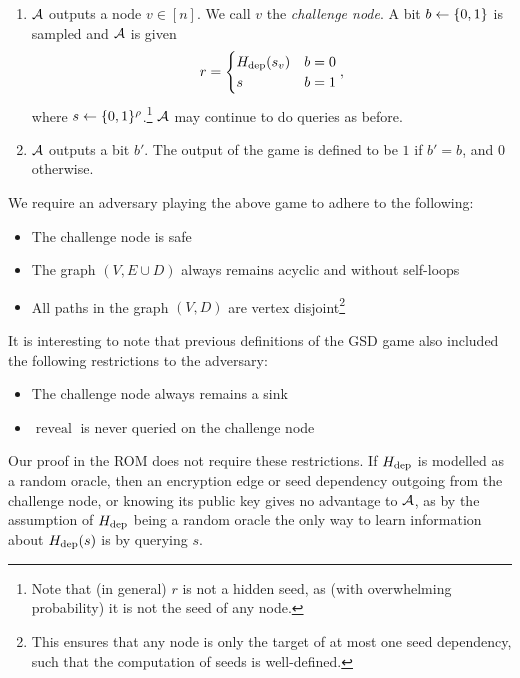 \begin{definition}
\begin{enumerate}[1.]
\begin{itemize}
		      \end{itemize}
		\item $\mathcal{A}$ outputs a node $v \in [n]$. We call $v$ the \emph{challenge node}. A bit $b \leftarrow \{0, 1\}$ is sampled and $\mathcal{A}$ is given
		      \[
			      r = \begin{cases}
				      H_\mathrm{dep}(s_v) & b = 0 \\
				      s          & b = 1
			      \end{cases},
		      \]
		      where $s \leftarrow \{0, 1\}^\rho$.\footnote{Note that (in general) $r$ is not a hidden seed, as (with overwhelming probability) it is not the seed of any node.} $\mathcal{A}$ may continue to do queries as before.
		\item \label{def:sd-gsd-game-step-output} $\mathcal{A}$ outputs a bit $b'$. The output of the game is defined to be $1$ if $b' = b$, and $0$ otherwise.
	\end{enumerate}

	We require an adversary playing the above game to adhere to the following:
	\begin{itemize}
		\item The challenge node is safe
		\item The graph $(V, E \cup D)$ always remains acyclic and without self-loops
		\item All paths in the graph $(V, D)$ are vertex disjoint\footnote{This ensures that any node is only the target of at most one seed dependency, such that the computation of seeds is well-defined.}
	\end{itemize}
\end{definition}

It is interesting to note that previous definitions of the GSD game also included the following restrictions to the adversary:
\begin{itemize}
	\item The challenge node always remains a sink
	\item $\operatorname{reveal}$ is never queried on the challenge node
\end{itemize}
Our proof in the ROM does not require these restrictions. If $H_\mathrm{dep}$ is modelled as a random oracle, then an encryption edge or seed dependency outgoing from the challenge node, or knowing its public key gives no advantage to $\mathcal{A}$, as by the assumption of $H_\mathrm{dep}$ being a random oracle the only way to learn information about $H_\mathrm{dep}(s)$ is by querying $s$.

